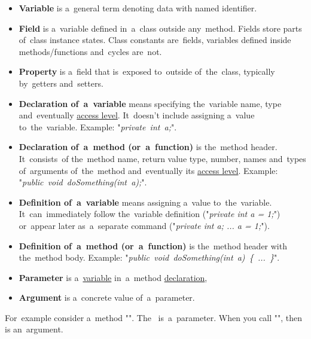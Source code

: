 \label{compiledinterpretedlanguages}

\label{variablefieldproperty}
\begin{itemize}
    \item \textbf{Variable} is a~general term denoting data with named identifier.
    \item \textbf{Field} is a~variable defined in~a~class outside any~method. Fields store parts of~class instance states. Class constants are~fields, variables defined inside \mbox{methods/functions} and~cycles are~not.
    \item \textbf{Property} is a~field that is~exposed to~outside of~the~class, typically by~getters and~setters.
\end{itemize}

\label{declarationdefinition}
\begin{itemize}
    \item \textbf{Declaration of~a~variable} means specifying the~variable name, type and~eventually \hyperref[accessmodifiers]{access level}. It~doesn't include assigning a~value to~the~variable. Example: "\textit{\mbox{private int a;}}".
    \item \textbf{Declaration of~a~method (or~a~function)} is the~method header. It~consists~of the~method name, return value type, number, names and~types of~arguments of~the~method and~eventually its \hyperref[accessmodifiers]{access level}. Example: "\textit{\mbox{public void doSomething(int a);}}".
    \item \textbf{Definition of~a~variable} means assigning a~value to~the~variable. It~can~immediately follow the~variable definition ("\textit{private int a = 1;}") or~appear later as~a~separate command ("\textit{private int a; ... a = 1;}").
    \item \textbf{Definition of~a~method (or~a~function)} is the~method header with the~method body. Example: "\textit{\mbox{public void doSomething(int a) \{ ... \}}}".
\end{itemize}

\label{parameterargument}
\begin{itemize}
    \item \textbf{Parameter} is a~\hyperref[variablefieldproperty]{variable} in~a~method \hyperref[declarationdefinition]{declaration},
    \item \textbf{Argument} is a~concrete value of~a~parameter.
\end{itemize}
For~example consider a~method "". The~ is~a~parameter. When you call "", then  is an~argument.

